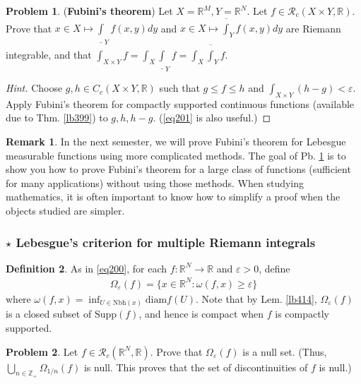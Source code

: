 \documentclass[12pt,b5paper,notitlepage]{article}
\theoremstyle{definition}
\newtheorem{df}{Definition}[section]
\newtheorem{rem}[df]{Remark}
\newtheorem{prob}{\color{red}Problem}[section]
\theoremstyle{plain}
\newcommand{\ovl}{\overline}
\newcommand{\udl}{\underline}
\newcommand{\scr}{\mathscr}
\newcommand{\Zbb}{\mathbb Z}
\newcommand{\Rbb}{\mathbb R}
\newcommand{\Supp}{\mathrm{Supp}}
\newcommand{\dps}{\displaystyle}
\newcommand{\Nbh}{\mathrm{Nbh}}
\newcommand{\diam}{\mathrm{diam}}
\newcommand{\eps}{\varepsilon}
\numberwithin{equation}{section}
\begin{document}
\begin{prob}\label{lb493}
(\textbf{Fubini's theorem}) Let $X=\Rbb^M,Y=\Rbb^N$. Let $f\in\scr R_c(X\times Y,\Rbb)$.  Prove that $x\in X\mapsto \udl\int_Y f(x,y)dy $ and $x\in X\mapsto\ovl\int_Y f(x,y)dy$ are Riemann integrable, and that $\dps\int_{X\times Y}f=\int_X\udl\int_Yf=\int_X{\ovl\int_Y}f$.
\end{prob}

\begin{proof}[Hint]
Choose $g,h\in C_c(X\times Y,\Rbb)$ such that $g\leq f\leq h$ and $\int_{X\times Y}(h-g)<\eps$. Apply Fubini's theorem for compactly supported continuous functions (available due to Thm. \ref{lb399}) to $g,h,h-g$. (\eqref{eq201} is also useful.)
\end{proof}

\begin{rem}
In the next semester, we will prove Fubini's theorem for Lebesgue measurable functions using more complicated methods. The goal of Pb. \ref{lb493} is to show you how to prove Fubini's theorem for a large class of functions (sufficient for many applications) without using those methods. When studying mathematics, it is often important to know how to simplify a proof when the objects studied are simpler.
\end{rem}




\subsubsection{$\star$ Lebesgue's criterion for multiple Riemann integrals}\label{lb495} 

\begin{df}
As in \eqref{eq200}, for each $f:\Rbb^N\rightarrow\Rbb$ and $\eps>0$, define
\begin{align}
\Omega_\eps(f)=\{x\in\Rbb^N:\omega(f,x)\geq\eps\}
\end{align}
where $\omega(f,x)=\inf_{U\in\Nbh(x)}\diam f(U)$. Note that by Lem. \ref{lb414}, $\Omega_\eps(f)$ is a closed subset of $\Supp(f)$, and hence is compact when $f$ is compactly supported.
\end{df}


\begin{prob}
Let $f\in \scr R_c(\Rbb^N,\Rbb)$.   Prove that $\Omega_\eps(f)$ is a null set. (Thus, $\bigcup_{n\in\Zbb_+}\Omega_{1/n}(f)$ is null. This proves that the set of discontinuities of $f$ is null.)
\end{prob}
\end{document}
